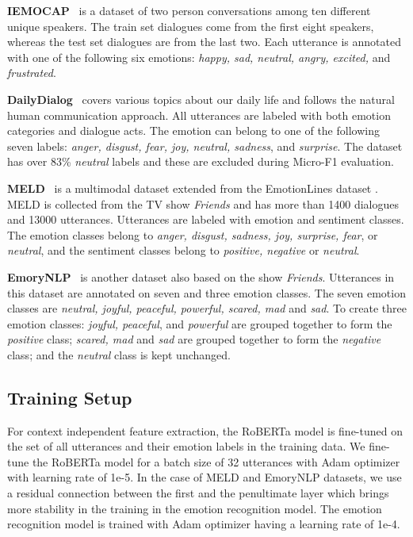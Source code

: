 \documentclass[11pt,a4paper]{article}
\begin{document}
\textbf{IEMOCAP}~\cite{iemocap} is a dataset of two person conversations among ten different unique speakers. The train set dialogues come from the first eight speakers, whereas the test set dialogues are from the last two. Each utterance is annotated with one of the following six emotions: \textit{happy, sad, neutral, angry, excited,} and \textit{frustrated}.

\textbf{DailyDialog}~\cite{li2017dailydialog}
covers various topics about our daily life and follows the natural human communication approach. All utterances are labeled with both emotion categories and dialogue acts. The emotion can belong to one of the following seven labels: \textit{anger, disgust, fear, joy, neutral, sadness}, and \textit{surprise}. The dataset has over 83\% \textit{neutral} labels and these are excluded during Micro-F1 evaluation.

\textbf{MELD}~\cite{poria2018meld} is
a multimodal dataset extended from the EmotionLines dataset \cite{chen2018emotionlines}. MELD is
collected from the TV show \textit{Friends} and has more than 1400 dialogues and 13000 utterances. Utterances
are labeled with emotion and sentiment classes. The emotion classes  belong to \textit{anger, disgust, sadness, joy, surprise, fear}, or \textit{neutral}, and the sentiment classes  belong to \textit{positive, negative} or \textit{neutral}.

\textbf{EmoryNLP}~\cite{zahiri2018emotion} is another dataset also based on the show \textit{Friends}. Utterances in this dataset are annotated on seven and three emotion classes. The seven emotion classes are \textit{neutral, joyful, peaceful, powerful, scared, mad} and \textit{sad}. To create three emotion classes: \textit{joyful, peaceful}, and \textit{powerful} are grouped together to form the \textit{positive} class; \textit{scared, mad} and \textit{sad} are grouped together to form the \textit{negative} class; and the \textit{neutral} class is kept unchanged.

\subsection{Training Setup}
For context independent feature extraction, the RoBERTa model is fine-tuned on the set of all utterances and their emotion labels in the training data. We fine-tune the RoBERTa model for a batch size of 32 utterances with Adam optimizer with learning rate of 1e-5. In the case of MELD and EmoryNLP datasets, we use a residual connection between the first and the penultimate layer which brings more stability in the training in the emotion recognition model.
The emotion recognition model is trained with Adam optimizer having a learning rate of 1e-4.
\end{document}
